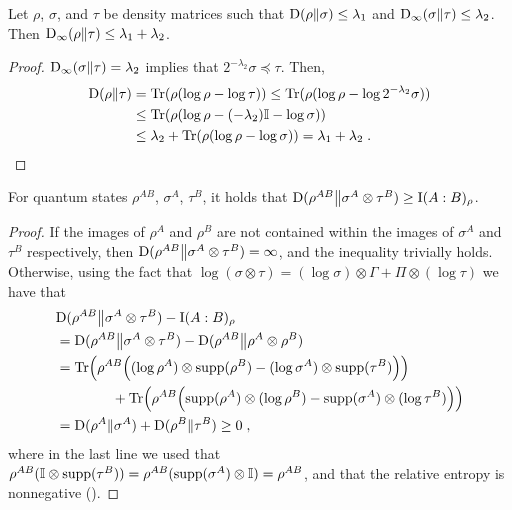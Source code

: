 \begin{proposition}
\label{prop:relative_min_entropy_chain_rule2}
Let $\rho$, $\sigma$, and $\tau$ be density matrices such that $\mathrm{D}(\rho \| \sigma) \leq \lambda_1$ and $\mathrm{D}_\infty(\sigma \| \tau) \leq \lambda_2$. Then $\mathrm{D}_\infty(\rho \| \tau) \leq \lambda_1 + \lambda_2$.
\end{proposition}
\begin{proof}
	$\mathrm{D}_\infty(\sigma \| \tau) = \lambda_2$ implies that $2^{-\lambda_2} \sigma \preceq \tau$. Then,
	\begin{align*}
		\mathrm{D}(\rho \| \tau) &= \mbox{\rm Tr}(\rho (\log \rho - \log \tau)) \leq \mbox{\rm Tr}(\rho(\log \rho - \log 2^{-\lambda_2} \sigma)) \\
		&\leq \mbox{\rm Tr}(\rho(\log \rho - (-\lambda_2)\mathbb{I} - \log \sigma)) \\
		&\leq \lambda_2 + \mbox{\rm Tr}(\rho (\log \rho - \log \sigma)) = \lambda_1 + \lambda_2\;.
	\end{align*}
\end{proof}


\begin{proposition}
\label{prop:divergence_gibbs_inequality}
	For quantum states $\rho^{AB}$, $\sigma^A$, $\tau^B$, it holds that $\mathrm{D}(\rho^{AB} \big \| \sigma^A \otimes \tau^B) \geq \mathrm{I}(A : B)_\rho$.
\end{proposition}
\begin{proof}
	If the images of $\rho^{A}$ and $\rho^B$ are not contained within the images of $\sigma^A$ and $\tau^B$ respectively, then $\mathrm{D}(\rho^{AB} \big \| \sigma^A \otimes \tau^B) = \infty$, and the inequality trivially holds. Otherwise, using the fact that $\log (\sigma \otimes \tau) = (\log \sigma)\otimes \Gamma + \Pi \otimes (\log \tau)$ we have that
	\begin{align*}
	&\mathrm{D}(\rho^{AB} \big \| \sigma^A \otimes \tau^B) - \mathrm{I}(A:B)_\rho \\
	&= \mathrm{D}(\rho^{AB} \big \| \sigma^A \otimes \tau^B) - \mathrm{D}(\rho^{AB} \big \| \rho^A \otimes \rho^B) \\
		&=  \mbox{\rm Tr} \Big( \rho^{AB} \Big( (\log \rho^A) \otimes \mathrm{supp}(\rho^B) - (\log \sigma^A) \otimes \mathrm{supp}(\tau^B) \Big) \Big) \\
		& \qquad \qquad + \mbox{\rm Tr} \Big( \rho^{AB} \Big( \mathrm{supp}(\rho^A) \otimes (\log \rho^B)  - \mathrm{supp}(\sigma^A) \otimes (\log \tau^B) \Big) \Big) \\
		&= \mathrm{D}(\rho^A \| \sigma^A) + \mathrm{D}(\rho^B \| \tau^B) \geq 0\;,
	\end{align*}
	where in the last line we used that $\rho^{AB} (\mathbb{I} \otimes \mathrm{supp}(\tau^B)) = \rho^{AB} (\mathrm{supp}(\sigma^A) \otimes \mathbb{I}) = \rho^{AB}$, and that the relative entropy is nonnegative (). 
\end{proof}

